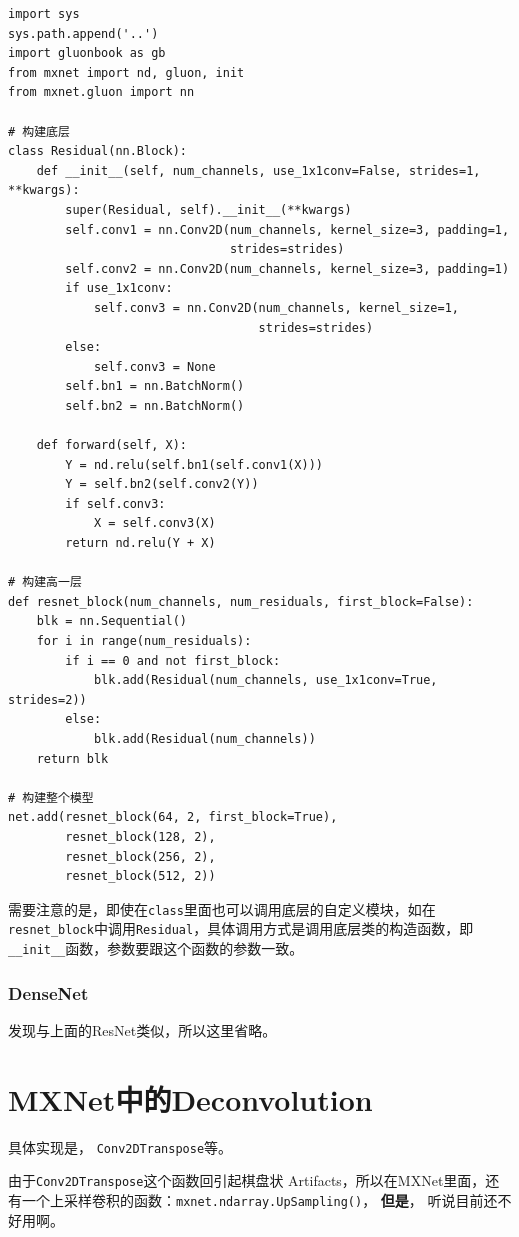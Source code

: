 \begin{lstlisting}
import sys
sys.path.append('..')
import gluonbook as gb
from mxnet import nd, gluon, init
from mxnet.gluon import nn

# 构建底层
class Residual(nn.Block):
    def __init__(self, num_channels, use_1x1conv=False, strides=1, **kwargs):
        super(Residual, self).__init__(**kwargs)
        self.conv1 = nn.Conv2D(num_channels, kernel_size=3, padding=1,
                               strides=strides)
        self.conv2 = nn.Conv2D(num_channels, kernel_size=3, padding=1)
        if use_1x1conv:
            self.conv3 = nn.Conv2D(num_channels, kernel_size=1,
                                   strides=strides)
        else:
            self.conv3 = None
        self.bn1 = nn.BatchNorm()
        self.bn2 = nn.BatchNorm()

    def forward(self, X):
        Y = nd.relu(self.bn1(self.conv1(X)))
        Y = self.bn2(self.conv2(Y))
        if self.conv3:
            X = self.conv3(X)
        return nd.relu(Y + X)

# 构建高一层        
def resnet_block(num_channels, num_residuals, first_block=False):
    blk = nn.Sequential()
    for i in range(num_residuals):
        if i == 0 and not first_block:
            blk.add(Residual(num_channels, use_1x1conv=True, strides=2))
        else:
            blk.add(Residual(num_channels))
    return blk
    
# 构建整个模型
net.add(resnet_block(64, 2, first_block=True),
        resnet_block(128, 2),
        resnet_block(256, 2),
        resnet_block(512, 2))        
\end{lstlisting}

需要注意的是，即使在\verb|class|里面也可以调用底层的自定义模块，如在\verb|resnet_block|中调用\verb|Residual|，具体调用方式是调用底层类的构造函数，即\verb|__init__|函数，参数要跟这个函数的参数一致。

\subsubsection{DenseNet}

发现与上面的ResNet类似，所以这里省略。

\section{MXNet中的Deconvolution}

具体实现是， \verb|Conv2DTranspose|等。

由于\verb|Conv2DTranspose|这个函数回引起棋盘状 Artifacts，所以在MXNet里面，还有一个上采样卷积的函数：\verb|mxnet.ndarray.UpSampling()|， \textbf{但是}， 听说目前还不好用啊。














